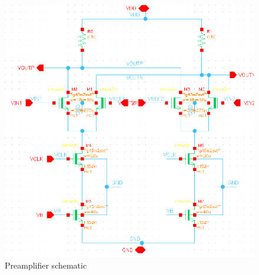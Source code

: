 \documentclass[a4paper,12pt]{article}
\begin{document}
\begin{figure}[H]
    \centering
    \includegraphics[max width = \textwidth]{Flash_ADC_images/Preamp_sch.png}
    \caption{Preamplifier schematic}
    \label{fig:enter-label}
\end{figure}
\end{document}
